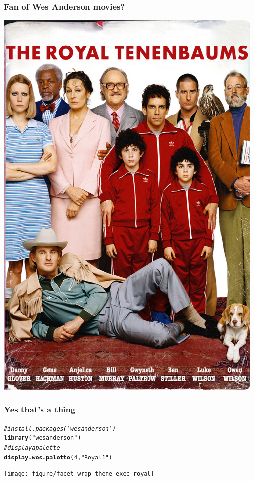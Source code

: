 \documentclass{beamer}\usepackage[]{graphicx}\usepackage[]{color}
\makeatletter
\newcommand{\hlnum}[1]{\textcolor[rgb]{0.686,0.059,0.569}{#1}}%
\newcommand{\hlstr}[1]{\textcolor[rgb]{0.192,0.494,0.8}{#1}}%
\newcommand{\hlcom}[1]{\textcolor[rgb]{0.678,0.584,0.686}{\textit{#1}}}%
\newcommand{\hlstd}[1]{\textcolor[rgb]{0.345,0.345,0.345}{#1}}%
\newcommand{\hlkwd}[1]{\textcolor[rgb]{0.737,0.353,0.396}{\textbf{#1}}}%
\newenvironment{kframe}{%
 \def\at@end@of@kframe{}%
 \ifinner\ifhmode%
  \def\at@end@of@kframe{\end{minipage}}%
  \begin{minipage}{\columnwidth}%
 \fi\fi%
 \def\FrameCommand##1{\hskip\@totalleftmargin \hskip-\fboxsep
 \colorbox{shadecolor}{##1}\hskip-\fboxsep
     \hskip-\linewidth \hskip-\@totalleftmargin \hskip\columnwidth}%
 \MakeFramed {\advance\hsize-\width
   \@totalleftmargin\z@ \linewidth\hsize
   \@setminipage}}%
 {\par\unskip\endMakeFramed%
 \at@end@of@kframe}
\newenvironment{knitrout}{}{} %
\makeatother
\begin{document}
\begin{frame}[fragile]
\frametitle{Fan of Wes Anderson movies?}
\begin{center}
\includegraphics[scale=.12]{images/tenenbaums.png}
\end{center}
\end{frame}


\begin{frame}[fragile]
\frametitle{Yes that's a thing}
\begin{center}
\begin{knitrout}\footnotesize
{}\color{fgcolor}\begin{kframe}
\begin{alltt}
\hlcom{# install.packages('wesanderson')}
\hlkwd{library}\hlstd{(}\hlstr{"wesanderson"}\hlstd{)}
\hlcom{# display a palette}
\hlkwd{display.wes.palette}\hlstd{(}\hlnum{4}\hlstd{,} \hlstr{"Royal1"}\hlstd{)}
\end{alltt}
\end{kframe}

{\centering \texttt{[image: figure/facet\_wrap\_theme\_exec\_royal]} 

}



\end{knitrout}
\end{center}
\end{frame}
\end{document}
